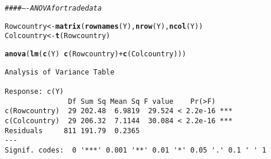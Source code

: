 \documentclass[11pt]{article}\usepackage[]{graphicx}\usepackage[]{color}
\makeatletter
\newcommand{\hlcom}[1]{\textcolor[rgb]{0.678,0.584,0.686}{\textit{#1}}}%
\newcommand{\hlopt}[1]{\textcolor[rgb]{0,0,0}{#1}}%
\newcommand{\hlstd}[1]{\textcolor[rgb]{0.345,0.345,0.345}{#1}}%
\newcommand{\hlkwb}[1]{\textcolor[rgb]{0.69,0.353,0.396}{#1}}%
\newcommand{\hlkwd}[1]{\textcolor[rgb]{0.737,0.353,0.396}{\textbf{#1}}}%
\newenvironment{kframe}{%
 \def\at@end@of@kframe{}%
 \ifinner\ifhmode%
  \def\at@end@of@kframe{\end{minipage}}%
  \begin{minipage}{\columnwidth}%
 \fi\fi%
 \def\FrameCommand##1{\hskip\@totalleftmargin \hskip-\fboxsep
 \colorbox{shadecolor}{##1}\hskip-\fboxsep
     \hskip-\linewidth \hskip-\@totalleftmargin \hskip\columnwidth}%
 \MakeFramed {\advance\hsize-\width
   \@totalleftmargin\z@ \linewidth\hsize
   \@setminipage}}%
 {\par\unskip\endMakeFramed%
 \at@end@of@kframe}
\newenvironment{knitrout}{}{} %
\makeatother
\begin{document}
\begin{knitrout}\footnotesize
{}\color{fgcolor}\begin{kframe}
\begin{alltt}
\hlcom{#### ---- ANOVA for trade data}

\hlstd{Rowcountry}\hlkwb{<-}\hlkwd{matrix}\hlstd{(}\hlkwd{rownames}\hlstd{(Y),}\hlkwd{nrow}\hlstd{(Y),}\hlkwd{ncol}\hlstd{(Y))}
\hlstd{Colcountry}\hlkwb{<-}\hlkwd{t}\hlstd{(Rowcountry)}

\hlkwd{anova}\hlstd{(}\hlkwd{lm}\hlstd{(} \hlkwd{c}\hlstd{(Y)} \hlopt{~} \hlkwd{c}\hlstd{(Rowcountry)} \hlopt{+} \hlkwd{c}\hlstd{(Colcountry) ) )}
\end{alltt}
\begin{verbatim}
Analysis of Variance Table

Response: c(Y)
               Df Sum Sq Mean Sq F value    Pr(>F)    
c(Rowcountry)  29 202.48  6.9819  29.524 < 2.2e-16 ***
c(Colcountry)  29 206.32  7.1144  30.084 < 2.2e-16 ***
Residuals     811 191.79  0.2365                      
---
Signif. codes:  0 '***' 0.001 '**' 0.01 '*' 0.05 '.' 0.1 ' ' 1
\end{verbatim}
\end{kframe}
\end{knitrout}
\end{document}
